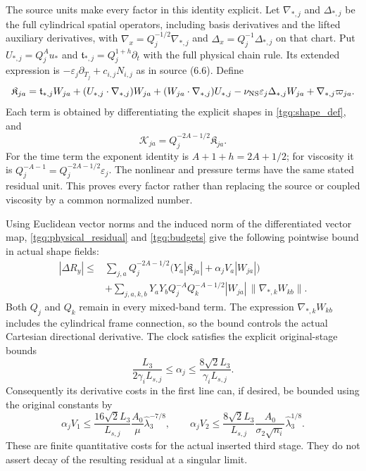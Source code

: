 The source units make every factor in this identity explicit.
Let $\nabla_{*,j}$ and $\Delta_{*,j}$ be the full cylindrical spatial
operators, including basis derivatives and the lifted auxiliary
derivatives, with
$\nabla_x=Q_j^{-1/2}\nabla_{*,j}$ and
$\Delta_x=Q_j^{-1}\Delta_{*,j}$ on that chart.
Put $U_{*,j}=Q_j^Au_*$ and
$\mathfrak t_{*,j}=Q_j^{1+h}\partial_t$ with the full physical
chain rule. Its extended expression is
$-\varepsilon_j\partial_{T_j}+c_{i,j}N_{i,j}$ as in source (6.6).
Define
\[
 \mathfrak K_{ja}=
 \mathfrak t_{*,j}W_{ja}
 +(U_{*,j}\cdot\nabla_{*,j})W_{ja}
 +(W_{ja}\cdot\nabla_{*,j})U_{*,j}
 -\nu_{\rm NS}\varepsilon_j\Delta_{*,j}W_{ja}
 +\nabla_{*,j}\varpi_{ja}.
\]
Each term is obtained by differentiating the explicit shapes in
\eqref{tgq:shape_def}, and
\[
 \mathcal K_{ja}=Q_j^{-2A-1/2}\mathfrak K_{ja}.
\]
For the time term the exponent identity is $A+1+h=2A+1/2$;
for viscosity it is
$Q_j^{-A-1}=Q_j^{-2A-1/2}\varepsilon_j$.
The nonlinear and pressure terms have the same stated residual unit.
This proves every factor rather than replacing the source or coupled
viscosity by a common normalized number.

Using Euclidean vector norms and the induced norm of the differentiated
vector map, \eqref{tgq:physical_residual} and
\eqref{tgq:budgets} give the following pointwise bound in actual
shape fields:
\begin{equation}
 \begin{split}
 |\Delta R_y|\le{}&
 \sum_{j,a}Q_j^{-2A-1/2}
       \bigl(Y_a|\mathfrak K_{ja}|+\alpha_jV_a|W_{ja}|\bigr)\\
 &+\sum_{j,a,k,b}Y_aY_bQ_j^{-A}Q_k^{-A-1/2}
                   |W_{ja}|\,\|\nabla_{*,k}W_{kb}\|.
 \end{split}\label{tgq:residual_bound}
\end{equation}
Both $Q_j$ and $Q_k$ remain in every mixed-band term.
The expression $\nabla_{*,k}W_{kb}$ includes the cylindrical frame
connection, so the bound controls the actual Cartesian directional
derivative. The clock satisfies the explicit original-stage bounds
\[
 \frac{L_3}{2\gamma_iL_{s,j}}\le\alpha_j
       \le\frac{8\sqrt2L_3}{\gamma_iL_{s,j}}.
\]
Consequently its derivative costs in the first line can, if desired,
be bounded using the original constants by
\[
 \alpha_jV_1\le
  \frac{16\sqrt2L_3}{L_{s,j}}
       \frac{A_0}{\mu}\widehat\lambda_3^{-7/8},\qquad
 \alpha_jV_2\le
  \frac{8\sqrt2L_3}{L_{s,j}}
       \frac{A_0}{\sigma_2\sqrt{n_i}}\widehat\lambda_3^{1/8}.
\]
These are finite quantitative costs for the actual inserted third stage.
They do not assert decay of the resulting residual at a singular limit.

